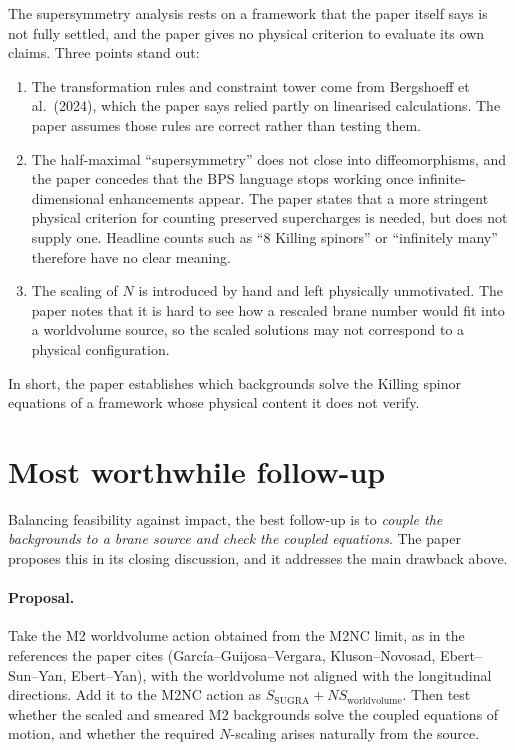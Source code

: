 \documentclass[11pt]{article}
\begin{document}
The supersymmetry analysis rests on a framework that the paper itself says is not fully settled, and the paper gives no physical criterion to evaluate its own claims. Three points stand out:
\begin{enumerate}
  \item The transformation rules and constraint tower come from Bergshoeff et al.~(2024), which the paper says relied partly on linearised calculations. The paper assumes those rules are correct rather than testing them.
  \item The half-maximal ``supersymmetry'' does not close into diffeomorphisms, and the paper concedes that the BPS language stops working once infinite-dimensional enhancements appear. The paper states that a more stringent physical criterion for counting preserved supercharges is needed, but does not supply one. Headline counts such as ``8 Killing spinors'' or ``infinitely many'' therefore have no clear meaning.
  \item The scaling of $N$ is introduced by hand and left physically unmotivated. The paper notes that it is hard to see how a rescaled brane number would fit into a worldvolume source, so the scaled solutions may not correspond to a physical configuration.
\end{enumerate}
In short, the paper establishes which backgrounds solve the Killing spinor equations of a framework whose physical content it does not verify.

\section{Most worthwhile follow-up}

Balancing feasibility against impact, the best follow-up is to \emph{couple the backgrounds to a brane source and check the coupled equations}. The paper proposes this in its closing discussion, and it addresses the main drawback above.

\paragraph{Proposal.} Take the M2 worldvolume action obtained from the M2NC limit, as in the references the paper cites (Garc\'{i}a--Guijosa--Vergara, Kluson--Novosad, Ebert--Sun--Yan, Ebert--Yan), with the worldvolume not aligned with the longitudinal directions. Add it to the M2NC action as $S_{\text{SUGRA}} + N S_{\text{worldvolume}}$. Then test whether the scaled and smeared M2 backgrounds solve the coupled equations of motion, and whether the required $N$-scaling arises naturally from the source.
\end{document}
